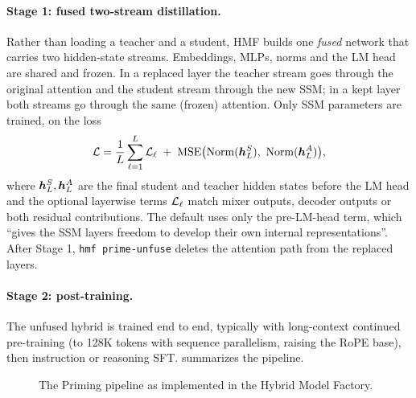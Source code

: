 \paragraph{Stage 1: fused two-stream distillation.} Rather than loading a teacher and a student,
HMF builds one \emph{fused} network that carries two hidden-state streams. Embeddings, MLPs, norms
and the LM head are shared and frozen. In a replaced layer the teacher stream goes through the
original attention and the student stream through the new SSM; in a kept layer both streams go
through the same (frozen) attention. Only SSM parameters are trained, on the loss
\begin{equation}\label{eq:c12-prime-loss}
  \loss = \frac1L\sum_{\ell=1}^{L}\loss_\ell \;+\;
  \mathrm{MSE}\big(\mathrm{Norm}(\vh^{S}_L),\ \mathrm{Norm}(\vh^{A}_L)\big),
\end{equation}
where $\bm{h}^S_L,\bm{h}^A_L$ are the final student and teacher hidden states before the LM head and the
optional layerwise terms $\mathcal{L}_\ell$ match mixer outputs, decoder outputs or both residual
contributions. The default uses only the pre-LM-head term, which ``gives the SSM layers freedom to
develop their own internal representations''. After Stage 1, \texttt{hmf prime-unfuse} deletes the
attention path from the replaced layers.

\paragraph{Stage 2: post-training.} The unfused hybrid is trained end to end, typically with
long-context continued pre-training (to 128K tokens with sequence parallelism, raising the RoPE
base), then instruction or reasoning SFT.  summarizes the pipeline.

\begin{figure}[t]
\centering
{}
\caption{The Priming pipeline as implemented in the Hybrid Model Factory.}
\label{fig:c12-priming}
\end{figure}

